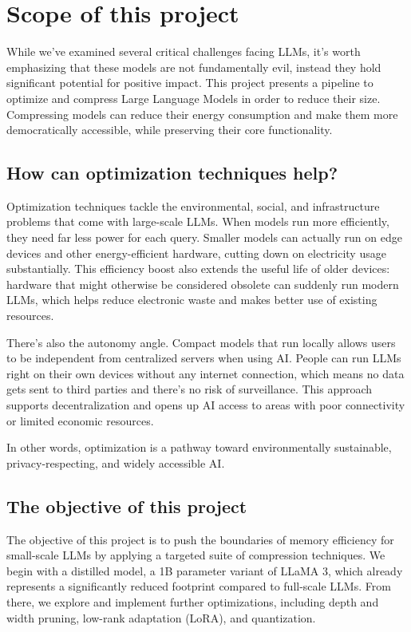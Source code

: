 \section{Scope of this project}
While we've examined several critical challenges facing LLMs, it's worth emphasizing that these models are not fundamentally evil, instead they hold significant potential for positive impact. This project presents a pipeline to optimize and compress Large Language Models in order to reduce their size. Compressing models can reduce their energy consumption and make them more democratically accessible, while preserving their core functionality.

\subsection{How can optimization techniques help?}
Optimization techniques tackle the environmental, social, and infrastructure problems that come with large-scale LLMs. When models run more efficiently, they need far less power for each query. Smaller models can actually run on edge devices and other energy-efficient hardware, cutting down on electricity usage substantially. This efficiency boost also extends the useful life of older devices: hardware that might otherwise be considered obsolete can suddenly run modern LLMs, which helps reduce electronic waste and makes better use of existing resources.

There's also the autonomy angle. Compact models that run locally allows users to be independent from centralized servers when using AI. People can run LLMs right on their own devices without any internet connection, which means no data gets sent to third parties and there's no risk of surveillance. This approach supports decentralization and opens up AI access to areas with poor connectivity or limited economic resources.

In other words, optimization is a pathway toward environmentally sustainable, privacy-respecting, and widely accessible AI.

\subsection{The objective of this project}
The objective of this project is to push the boundaries of memory efficiency for small-scale LLMs by applying a targeted suite of compression techniques. We begin with a distilled model, a 1B parameter variant of LLaMA 3, which already represents a significantly reduced footprint compared to full-scale LLMs. From there, we explore and implement further optimizations, including depth and width pruning, low-rank adaptation (LoRA), and quantization.

